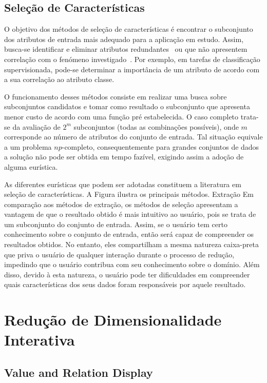 
\subsection{Seleção de Características} 

O objetivo dos métodos de seleção de características é encontrar o subconjunto  dos atributos de entrada mais adequado para a aplicação em estudo. 
Assim, busca-se identificar e eliminar atributos redundantes~\cite{Kohavi1997} ou que não apresentem correlação com o fenómeno investigado~\cite{Nilsson2007}. 
Por exemplo, em tarefas de classificação supervisionada, pode-se determinar a importância de um atributo de acordo com a sua correlação ao atributo classe. 

O funcionamento desses métodos consiste em realizar uma busca sobre subconjuntos candidatos e tomar como resultado o subconjunto que apresenta menor custo de acordo com uma função pré estabelecida. 
O caso completo trata-se da avaliação de $2^m$ subconjuntos (todas as combinações possíveis), onde $m$ corresponde ao número de atributos do conjunto de entrada. 
Tal situação equivale a um problema $np$-completo, consequentemente para grandes conjuntos de dados a solução não pode ser obtida em tempo fazível, exigindo assim a adoção de alguma eurística. 

As diferentes eurísticas que podem ser adotadas constituem a literatura em seleção de características. A Figura ilustra os principais métodos.
Extração 
Em comparação aos métodos de extração, os métodos de seleção apresentam a vantagem de que o resultado obtido é mais intuitivo ao usuário, pois se trata de um subconjunto do conjunto de entrada. 
Assim, se o usuário tem certo conhecimento sobre o conjunto de entrada, então será capaz de compreender os resultados obtidos.
No entanto, eles compartilham a mesma natureza caixa-preta que priva o usuário de qualquer interação durante o processo de redução, impedindo que o usuário  contribua com seu conhecimento sobre o domínio.
Além disso, devido à esta natureza, o usuário pode ter dificuldades em compreender quais características dos seus dados foram responsáveis por aquele resultado.

\section{Redução de Dimensionalidade Interativa}

\subsection{Value and Relation Display}\label{sec:var}

